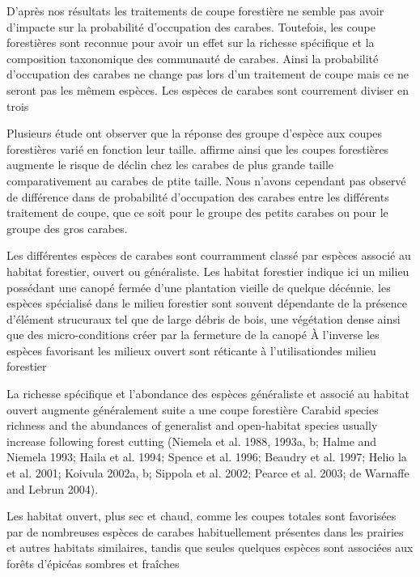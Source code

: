D'après nos résultats les traitements de coupe forestière ne semble pas avoir d'impacte sur la probabilité d'occupation des carabes.
Toutefois, les coupe forestières sont reconnue pour avoir un effet sur la richesse spécifique et la composition taxonomique des communauté de carabes.
Ainsi la probabilité d'occupation des carabes ne change pas lors d'un traitement de coupe mais ce ne seront pas les mêmem espèces. 
Les espèces de carabes sont courrement diviser en trois 

Plusieurs étude ont observer que la réponse des groupe d'espèce aux coupes forestières varié en fonction leur taille.
\cite{Nolte2019Habitatspecialization} affirme ainsi que les coupes forestières augmente le risque de déclin chez les carabes de plus grande taille comparativement au carabes de ptite taille.
Nous n'avons cependant pas observé de différence dans de probabilité d'occupation des carabes entre les différents traitement de coupe, que ce soit pour le groupe des petits carabes ou pour le groupe des gros carabes.


Les différentes espèces de carabes sont courramment classé par espèces associé au habitat forestier, ouvert ou généraliste.
Les habitat forestier indique ici un milieu possédant une canopé fermée d'une plantation vieille de quelque décénnie.
les espèces spécialisé dans le milieu forestier sont souvent dépendante de la présence d'élément strucuraux tel que de large débris de bois, une végétation dense ainsi que des micro-conditions créer par la fermeture de la canopé \citep{Niemela2007effectsforestry}
À l'inverse les espèces favorisant les milieux ouvert sont réticante à l'utilisationdes milieu forestier \citep{Heliola2001Distributioncarabid}

La richesse spécifique et l'abondance des espèces généraliste et associé au habitat ouvert augmente généralement suite a une coupe forestière \citep{Halme1993Carabidbeetles,Heliola2001Distributioncarabid,Koivula2002Alternativeharvesting}
Carabid species richness and the abundances of generalist and open-habitat species usually increase following forest cutting (Niemela  et al. 1988, 1993a, b; Halme and Niemela  1993; Haila et al. 1994; Spence et al. 1996; Beaudry et al. 1997; Helio  la  et al. 2001; Koivula 2002a, b; Sippola et al. 2002; Pearce et al. 2003; de Warnaffe and Lebrun 2004).

Les habitat ouvert, plus sec et chaud, comme les coupes totales sont favorisées par de nombreuses espèces de carabes habituellement présentes dans les prairies et autres habitats similaires, tandis que seules quelques espèces sont associées aux forêts d'épicéas sombres et fraîches \citep{Niemela1993Effectsclearcut}

